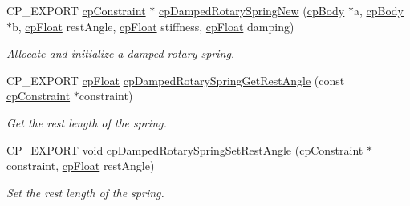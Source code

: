 \begin{DoxyCompactItemize}
\mbox{\label{group__cp_damped_rotary_spring_gaecd95eccf59fe47574b0d977bc6af491}} 
C\+P\+\_\+\+E\+X\+P\+O\+RT \mbox{\hyperlink{structcp_constraint}{cp\+Constraint}} $\ast$ \mbox{\hyperlink{group__cp_damped_rotary_spring_gaecd95eccf59fe47574b0d977bc6af491}{cp\+Damped\+Rotary\+Spring\+New}} (\mbox{\hyperlink{structcp_body}{cp\+Body}} $\ast$a, \mbox{\hyperlink{structcp_body}{cp\+Body}} $\ast$b, \mbox{\hyperlink{group__basic_types_gac1ed65573e035bf892505768c852d8d3}{cp\+Float}} rest\+Angle, \mbox{\hyperlink{group__basic_types_gac1ed65573e035bf892505768c852d8d3}{cp\+Float}} stiffness, \mbox{\hyperlink{group__basic_types_gac1ed65573e035bf892505768c852d8d3}{cp\+Float}} damping)
\begin{DoxyCompactList}\small\item\em Allocate and initialize a damped rotary spring. \end{DoxyCompactList}\item 
\mbox{\label{group__cp_damped_rotary_spring_gad64b790743acc1ee723df5c057821a85}} 
C\+P\+\_\+\+E\+X\+P\+O\+RT \mbox{\hyperlink{group__basic_types_gac1ed65573e035bf892505768c852d8d3}{cp\+Float}} \mbox{\hyperlink{group__cp_damped_rotary_spring_gad64b790743acc1ee723df5c057821a85}{cp\+Damped\+Rotary\+Spring\+Get\+Rest\+Angle}} (const \mbox{\hyperlink{structcp_constraint}{cp\+Constraint}} $\ast$constraint)
\begin{DoxyCompactList}\small\item\em Get the rest length of the spring. \end{DoxyCompactList}\item 
\mbox{\label{group__cp_damped_rotary_spring_gaef8aeefa0f56c4bc8c1b1b526d31bbc5}} 
C\+P\+\_\+\+E\+X\+P\+O\+RT void \mbox{\hyperlink{group__cp_damped_rotary_spring_gaef8aeefa0f56c4bc8c1b1b526d31bbc5}{cp\+Damped\+Rotary\+Spring\+Set\+Rest\+Angle}} (\mbox{\hyperlink{structcp_constraint}{cp\+Constraint}} $\ast$constraint, \mbox{\hyperlink{group__basic_types_gac1ed65573e035bf892505768c852d8d3}{cp\+Float}} rest\+Angle)
\begin{DoxyCompactList}\small\item\em Set the rest length of the spring. \end{DoxyCompactList}\item 
\mbox{\label{group__cp_damped_rotary_spring_ga0bdc853bacf56c54c246daa0fb40be62}} 

\end{DoxyCompactItemize}

